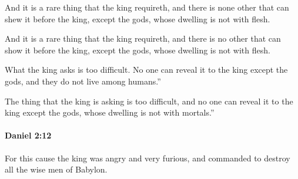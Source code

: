 			And it is a rare thing that the king requireth, and there is none other that can shew it before the king, except the gods, whose dwelling is not with flesh.

			\begin{versebox}
					\item[BHS] 
					\item[LXX] 
					\item[ASV] And it is a rare thing that the king requireth, and there is no other that can show it before the king, except the gods, whose dwelling is not with flesh.
					\item[NIV] What the king asks is too difficult. No one can reveal it to the king except the gods, and they do not live among humans.”
					\item[NRSV] The thing that the king is asking is too difficult, and no one can reveal it to the king except the gods, whose dwelling is not with mortals.”
			\end{versebox}

		\paragraph{Daniel 2:12} %
			\label{DANIEL-2-12}

			For this cause the king was angry and very furious, and commanded to destroy all the wise men of Babylon.


